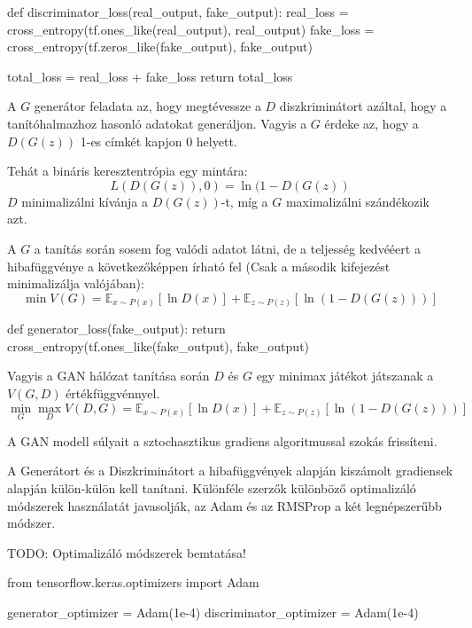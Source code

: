 \begin{python}
def discriminator_loss(real_output, fake_output):
    real_loss = cross_entropy(tf.ones_like(real_output), real_output)
    fake_loss = cross_entropy(tf.zeros_like(fake_output), fake_output)
    
    total_loss = real_loss + fake_loss
    return total_loss
\end{python}




A $G$ generátor feladata az, hogy megtévessze a $D$ diszkriminátort azáltal, hogy a tanítóhalmazhoz hasonló adatokat generáljon.
Vagyis a $G$ érdeke az, hogy a $D(G(z))$ 1-es címkét kapjon 0 helyett.

Tehát a bináris keresztentrópia egy mintára:
$$L(D(G(z)), 0) = \ln(1 - D(G(z))$$
$D$ minimalizálni kívánja a $D(G(z))$-t, míg a $G$ maximalizálni szándékozik azt.

A $G$ a tanítás során sosem fog valódi adatot látni, de a teljesség kedvééert a hibafüggvénye a következőképpen írható fel (Csak a második kifejezést minimalizálja valójában):
$$\min V(G) = \mathbb{E}_{x \sim P(x)} \left[\ln D(x) \right] + \mathbb{E}_{z \sim P(z)} \left[\ln(1 - D(G(z))) \right]$$

\begin{python}
def generator_loss(fake_output):
    return cross_entropy(tf.ones_like(fake_output), fake_output)
\end{python}


Vagyis a GAN hálózat tanítása során $D$ és $G$ egy minimax játékot játszanak a $V(G, D)$ értékfüggvénnyel.
$$\min_{G}\max_{D}V(D, G) =  \mathbb{E}_{x \sim P(x)} \left[\ln D(x) \right] + \mathbb{E}_{z \sim P(z)} \left[\ln(1 - D(G(z))) \right]$$



A GAN modell súlyait a sztochasztikus gradiens algoritmussal szokás frissíteni.

A Generátort és a Diszkriminátort a hibafüggvények alapján kiszámolt gradiensek alapján külön-külön kell tanítani. Különféle szerzők különböző optimalizáló módszerek használatát javasolják, az Adam és az RMSProp a két legnépszerűbb módszer.

TODO: Optimalizáló módszerek bemtatása!

\begin{python}
from tensorflow.keras.optimizers import Adam

generator_optimizer = Adam(1e-4)
discriminator_optimizer = Adam(1e-4)
\end{python}


